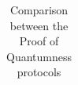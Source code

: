\begin{table}[!htp]
\begin{tabular}{|c|c|c|c|c|c|c|c|}
    \\
    &   &   &  & & &\\
    \hline
    \end{tabular}
    \label{t_2}
    \label{tab:compare}
    \caption{Comparison between the Proof of Quantumness protocols}
\end{table}